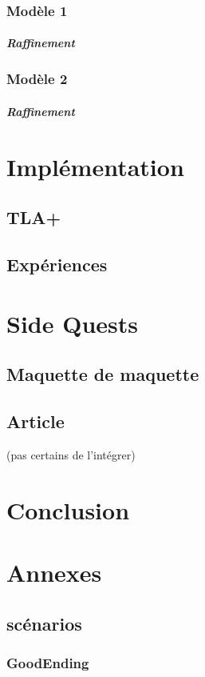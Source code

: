 \documentclass[oneside, a4paper, 11pt]{book}
\begin{document}
\subsection{Modèle 1}
\paragraph{Raffinement}


\subsection{Modèle 2}
\paragraph{Raffinement}



\chapter{Implémentation}
\label{sec:implem}
\section{TLA+}
\label{sec:tla}
\section{Expériences}
\label{sec:experiences}





\chapter{Side Quests}
\label{sec:sidequests}

\section{Maquette de maquette}
\section{Article}
(pas certains de l'intégrer)




\chapter{Conclusion}





\appendix

\chapter{Annexes}
\section{scénarios}
\subsection{GoodEnding}
\label{scenar:goodEnding}

\backmatter
%
%
\printindex
\end{document}
